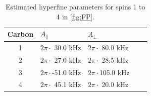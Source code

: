 \begin{table}[htbp]
    \begin{tabular}{cllll}
    Carbon & \quad \quad  $A_{\parallel} $ & \quad \quad $A_{\perp}$ \\ \hline
    1         & $2 \pi \cdot${ }30.0 kHz             & $2 \pi \cdot${ }80.0 kHz                \\
    2         & $2 \pi \cdot${ }27.0 kHz             & $2 \pi \cdot${ }28.5 kHz              \\
    3         & $2 \pi \cdot$-51.0 kHz          & $2 \pi \cdot$105.0 kHz              \\
    4         & $2 \pi \cdot${ }45.1 kHz           & $2 \pi \cdot${ }20.0 kHz                \\
    \end{tabular}
    \caption{Estimated hyperfine parameters for spins 1 to 4 in \cref{fig:FP}.}
    \label{tbl:HF_par}
\end{table}
